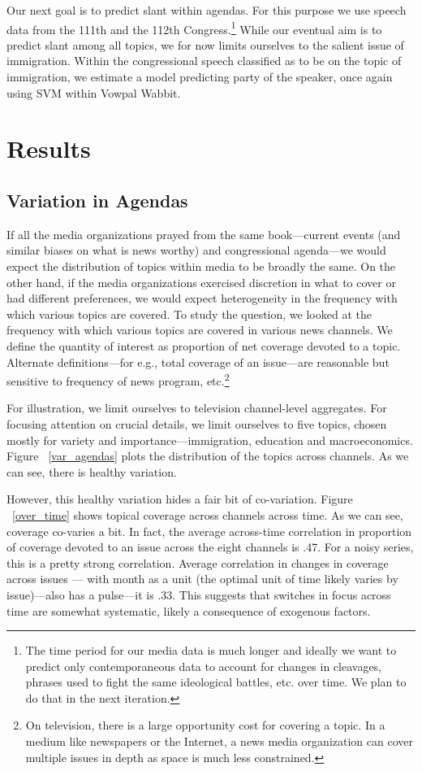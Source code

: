 \documentclass[12pt, letterpaper]{article}
\begin{document}
Our next goal is to predict slant within agendas. For this purpose we use speech data from the 111th and the 112th Congress.\footnote{The time period for our media data is much longer and ideally we want to predict only contemporaneous data to account for changes in cleavages, phrases used to fight the same ideological battles, etc. over time. We plan to do that in the next iteration.} While our eventual aim is to predict slant among all topics, we for now limits ourselves to the salient issue of immigration. Within the congressional speech classified as to be on the topic of immigration, we estimate a model predicting party of the speaker, once again using SVM within Vowpal Wabbit. 

\section*{Results}

\subsection*{Variation in Agendas}
If all the media organizations prayed from the same book---current events (and similar biases on what is news worthy) and congressional agenda---we would expect the distribution of topics within media to be broadly the same. On the other hand, if the media organizations exercised discretion in what to cover or had different preferences, we would expect heterogeneity in the frequency with which various topics are covered. To study the question, we looked at the frequency with which various topics are covered in various news channels. We define the quantity of interest as proportion of net coverage devoted to a topic. Alternate definitions---for e.g., total coverage of an issue---are reasonable but sensitive to frequency of news program, etc.\footnote{On television, there is a large opportunity cost for covering a topic. In a medium like newspapers or the Internet, a news media organization can cover multiple issues in depth as space is much less constrained.}

For illustration, we limit ourselves to television channel-level aggregates. For focusing attention on crucial details, we limit ourselves to five topics, chosen mostly for variety and importance---immigration, education and macroeconomics. Figure ~\ref{var_agendas} plots the distribution of the topics across channels. As we can see, there is healthy variation. 

However, this healthy variation hides a fair bit of co-variation. Figure ~\ref{over_time} shows topical coverage across channels across time. As we can see, coverage co-varies a bit. In fact, the average across-time correlation in proportion of coverage devoted to an issue across the eight channels is .47. For a noisy series, this is a pretty strong correlation. Average correlation in changes in coverage across issues --- with month as a unit (the optimal unit of time likely varies by issue)---also has a pulse---it is .33. This suggests that switches in focus across time are somewhat systematic, likely a consequence of exogenous factors.
\end{document}
